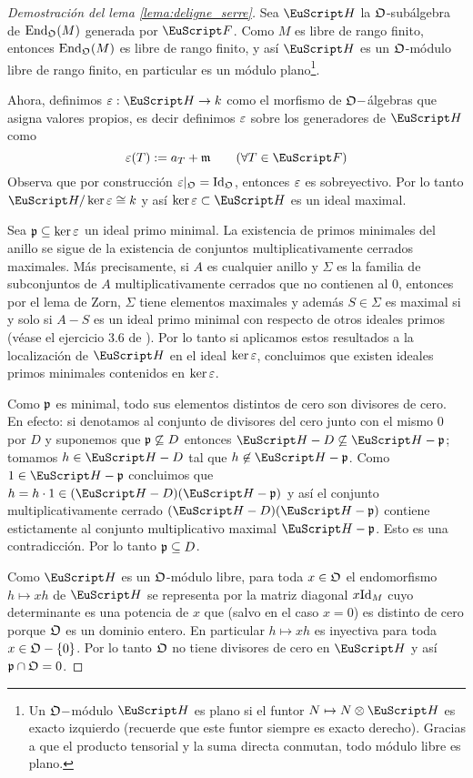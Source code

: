 \documentclass[../../tesis_maestria]{subfiles}
\begin{document}
\begin{proof}[Demostraci\'on del lema \ref{lema:deligne_serre}]
  Sea $\Hh$ la $\mathfrak{O}$-sub\'algebra de $\mathrm{End}_{\mathfrak{O}}(M)$ generada por $\Ff$. Como $M$ es libre de rango finito, entonces $\mathrm{End}_{\mathfrak{O}}(M)$ es libre de rango finito, y as\'i $\Hh$ es un $\mathfrak{O}$-m\'odulo libre de rango finito, en particular es un m\'odulo plano\footnote{Un $\mathfrak{O}-$m\'odulo $\Hh$ es plano si el funtor $N\mapsto N\otimes\Hh$ es exacto izquierdo (recuerde que este funtor siempre es exacto derecho). Gracias a que el producto tensorial y la suma directa conmutan, todo m\'odulo libre es plano.}.

  Ahora, definimos $\eps:\Hh\ra k$ como el morfismo de $\mathfrak{O}-$álgebras que asigna valores propios, es decir definimos $\varepsilon$ sobre los generadores de $\Hh$ como
  \[
    \eps(T):=a_T+\m\qquad(\forall T\in\Ff)
  \]
Observa que  por construcci\'on $\varepsilon|_{\mathfrak{O}}=\mathrm{Id}_{\mathfrak{O}}$, entonces $\varepsilon$ es sobreyectivo. Por lo tanto $\Hh/\ker\eps\cong k$ y as\'i $\ker\eps\subset\Hh$ es un ideal maximal.

Sea $\mathfrak{p}\subseteq\ker\varepsilon$ un ideal primo minimal. La existencia de primos minimales del anillo se sigue de la existencia de conjuntos multiplicativamente cerrados maximales. M\'as precisamente, si $A$ es cualquier anillo y $\Sigma$ es la familia de subconjuntos de $A$ multiplicativamente cerrados que no contienen al 0, entonces por el lema de Zorn, $\Sigma$ tiene elementos maximales y adem\'as $S\in\Sigma$ es maximal si y solo si $A-S$ es un ideal primo minimal con respecto de otros ideales primos (v\'ease el ejercicio 3.6 de \cite[\S3]{AtiyahITCA}). Por lo tanto si aplicamos estos resultados a la localizaci\'on de $\Hh$ en el ideal $\ker\varepsilon$, concluimos que existen ideales primos minimales contenidos en $\ker\varepsilon$.

Como $\mathfrak{p}$ es minimal, todo sus elementos distintos de cero son divisores de cero. En efecto: si denotamos al conjunto de divisores del cero junto con el mismo 0 por $D$ y suponemos que $\mathfrak{p}\not\subseteq D$ entonces $\Hh-D\not\subseteq\Hh-\p$; tomamos $h\in\Hh-D$ tal que $h\not\in\Hh-\p$. Como $1\in\Hh-\p$ concluimos que $h=h\cdot1\in(\Hh-D)(\Hh-\p)$ y as\'i el conjunto multiplicativamente cerrado $(\Hh-D)(\Hh-\p)$ contiene estictamente al conjunto multiplicativo maximal $\Hh-\p$. Esto es una contradicci\'on. Por lo tanto $\mathfrak{p}\subseteq D$.

  Como $\Hh$ es un $\mathfrak{O}$-m\'odulo libre, para toda $x\in\mathfrak{O}$ el endomorfismo $h\mapsto xh$ de $\Hh$ se representa por la matriz diagonal $x\mathrm{Id}_M$ cuyo determinante es una potencia de $x$ que (salvo en el caso $x=0$) es distinto de cero porque $\mathfrak{O}$ es un dominio entero. En particular $h\mapsto xh$ es inyectiva para toda $x\in\mathfrak{O}-\{0\}$. Por lo tanto $\mathfrak{O}$ no tiene divisores de cero en $\Hh$ y as\'i $\mathfrak{p}\cap\mathfrak{O}=0$.


\end{proof}
\end{document}
